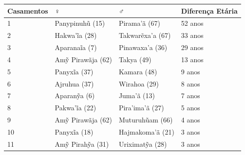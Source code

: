 \begin{table}[H]
\centering
\label{my-label}
\begin{tabular}{|l|l|l|l|}
\hline
Casamentos & \textbf{♀}         & ♂                 & Diferença Etária \\ \hline
1          & Panypinuhũ (15)   & Pirama'ã (67)     & 52 anos          \\ \hline
2          & Hakwa'ĩa (28)     & Takwarẽxa'a (67) & 33 anos          \\ \hline
3          & Aparanaĩa (7)     & Pinawaxa'a (36)   & 29 anos          \\ \hline
4          & Amỹ Pirawãja (62) & Takya (49)        & 13 anos          \\ \hline
5          & Panyxĩa (37)      & Kamara (48)       & 9 anos           \\ \hline
6          & Ajruhua (37)       & Wirahoa (29)      & 8 anos           \\ \hline
7          & Aparanỹa (6)      & Juma'ã (13)       & 7 anos           \\ \hline
8          & Pakwa'ĩa (22)      & Pira’ima'ã (27)   & 5 anos           \\ \hline
9          & Amỹ Pirawãja (62) & Muturuhũam (66)  & 4 anos           \\ \hline
10         & Panyxĩa (18)      & Hajmakoma'ã (21)  & 3 anos           \\ \hline
11         & Amỹ Pirahỹa (31) & Uriximatỹa (28)  & 3 anos           \\ \hline
\end{tabular}
\end{table}

